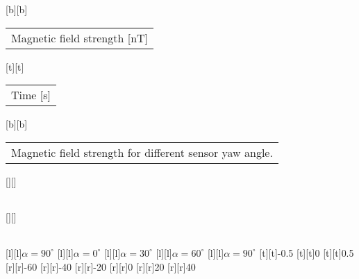 %
[b][b]{\fontsize{8}{12}\selectfont \setlength{\tabcolsep}{0pt}\begin{tabular}{c}Magnetic field strength [nT]\end{tabular}}%
[t][t]{\fontsize{8}{12}\selectfont \setlength{\tabcolsep}{0pt}\begin{tabular}{c}Time [s]\end{tabular}}%
[b][b]{\fontsize{8}{12}\selectfont \setlength{\tabcolsep}{0pt}\begin{tabular}{c}Magnetic field strength for different sensor yaw angle.\end{tabular}}%
[][]{\fontsize{10}{15}\selectfont \setlength{\tabcolsep}{0pt}\begin{tabular}{c} \end{tabular}}%
[][]{\fontsize{10}{15}\selectfont \setlength{\tabcolsep}{0pt}\begin{tabular}{c} \end{tabular}}%
[l][l]{\fontsize{6}{12}\selectfont $\alpha = 90^\circ$}%
[l][l]{\fontsize{6}{12}\selectfont $\alpha = 0^\circ$}%
[l][l]{\fontsize{6}{12}\selectfont $\alpha = 30^\circ$}%
[l][l]{\fontsize{6}{12}\selectfont $\alpha = 60^\circ$}%
[l][l]{\fontsize{6}{12}\selectfont $\alpha = 90^\circ$}%
%
\fontsize{6}{12}%
\selectfont%
%
[t][t]{-0.5}%
[t][t]{0}%
[t][t]{0.5}%
%
[r][r]{-60}%
[r][r]{-40}%
[r][r]{-20}%
[r][r]{0}%
[r][r]{20}%
[r][r]{40}%
%
%
